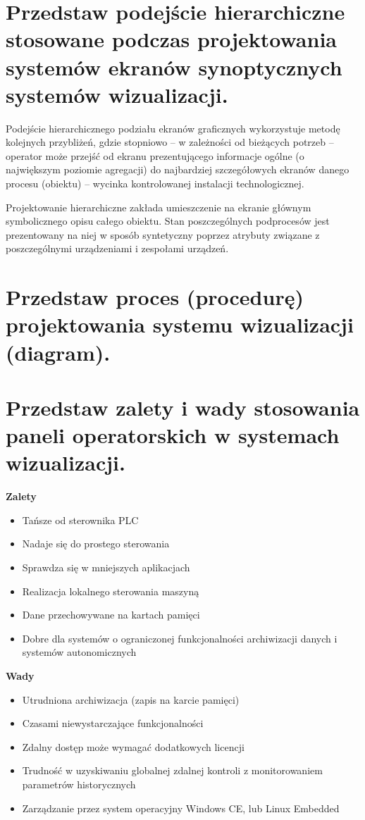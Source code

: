 \documentclass{article}
\begin{document}
	\section{Przedstaw podejście hierarchiczne stosowane podczas projektowania systemów	ekranów synoptycznych systemów wizualizacji.}
	Podejście hierarchicznego podziału ekranów graficznych wykorzystuje metodę kolejnych przybliżeń, gdzie stopniowo – w zależności od bieżących potrzeb – operator może przejść od ekranu prezentującego informacje ogólne (o największym poziomie agregacji) do najbardziej szczegółowych ekranów danego procesu (obiektu) – wycinka kontrolowanej instalacji technologicznej.
	
	Projektowanie hierarchiczne zakłada umieszczenie na ekranie głównym symbolicznego opisu całego obiektu. Stan poszczególnych podprocesów jest prezentowany na niej w sposób syntetyczny poprzez atrybuty związane z poszczególnymi urządzeniami i zespołami urządzeń.
	
	\section{Przedstaw proces (procedurę) projektowania systemu wizualizacji (diagram).}
	\section{ Przedstaw zalety i wady stosowania paneli operatorskich w systemach wizualizacji.}
	
	
	\textbf{Zalety}
	\begin{itemize}

	\item Tańsze od sterownika PLC
\item Nadaje się do prostego sterowania
\item Sprawdza się w mniejszych aplikacjach
\item Realizacja lokalnego sterowania maszyną
\item Dane przechowywane na kartach pamięci
\item Dobre dla systemów o ograniczonej funkcjonalności archiwizacji danych i systemów autonomicznych
		\end{itemize}
	\textbf{Wady}
	\begin{itemize}
\item Utrudniona archiwizacja (zapis na karcie pamięci)
\item Czasami niewystarczające funkcjonalności
\item Zdalny dostęp może wymagać dodatkowych licencji
\item Trudność w uzyskiwaniu globalnej zdalnej kontroli z monitorowaniem parametrów historycznych
\item Zarządzanie przez system operacyjny Windows CE, lub Linux Embedded
	\end{itemize}
	
\end{document}
